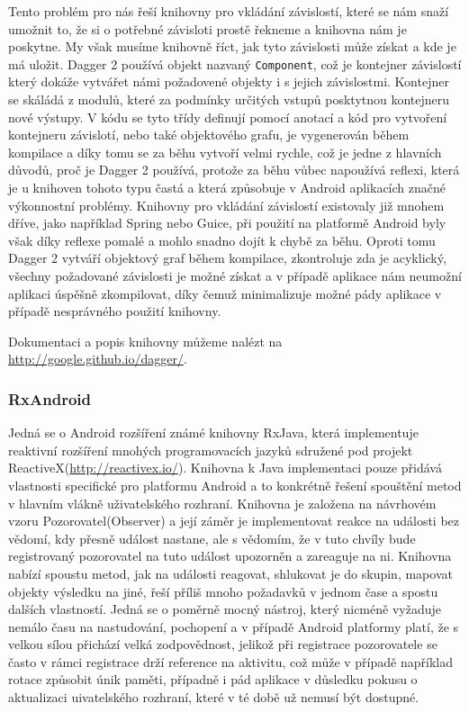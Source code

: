 \documentclass{article}
\begin{document}
Tento problém pro nás řeší knihovny pro vkládání závislostí, které se nám snaží umožnit to, že si o potřebné
závisloti prostě řekneme a knihovna nám je poskytne. My však musíme knihovně říct, jak tyto závislosti může
získat a kde je má uložit. Dagger 2 používá objekt nazvaný \texttt{Component}, což je kontejner závislostí
který dokáže vytvářet námi požadovené objekty i s jejich závislostmi. Kontejner se skáládá z modulů, které
za podmínky určitých vstupů posktytnou kontejneru nové výstupy. V kódu se tyto třídy definují pomocí anotací
a kód pro vytvoření kontejneru závislotí, nebo také objektového grafu, je vygenerován během kompilace
a díky tomu se za běhu vytvoří velmi rychle, což je jedne z hlavních důvodů, proč je Dagger 2 používá,
protože za běhu vůbec napoužívá reflexi, která je u knihoven tohoto typu častá a která způsobuje v Android
aplikacích značné výkonnostní problémy. Knihovny pro vkládání závislostí existovaly již mnohem dříve,
jako například Spring nebo Guice, při použití na platformě Android byly však díky reflexe pomalé a mohlo snadno
dojít k chybě za běhu. Oproti tomu Dagger 2 vytváří objektový graf během kompilace, zkontroluje zda je acyklický,
všechny požadované závislosti je možné získat a v případě aplikace nám neumožní aplikaci úspěšně zkompilovat,
díky čemuž minimalizuje možné pády aplikace v případě nesprávného použití knihovny.

Dokumentaci a popis knihovny můžeme nalézt na \url{http://google.github.io/dagger/}.

\subsubsection{RxAndroid}
Jedná se o Android rozšíření známé knihovny RxJava, která implementuje reaktivní rozšíření
mnohých programovacích jazyků sdružené pod projekt ReactiveX(\url{http://reactivex.io/}).
Knihovna k Java implementaci pouze přidává vlastnosti specifické pro platformu Android a to konkrétně
řešení spouštění metod v hlavním vlákně uživatelského rozhraní. Knihovna je založena na návrhovém
vzoru Pozorovatel(Observer) a její záměr je implementovat reakce na události bez vědomí, kdy přesně
událost nastane, ale s vědomím, že v tuto chvíly bude registrovaný pozorovatel na tuto událost
upozorněn a zareaguje na ni. Knihovna nabízí spoustu metod, jak na události reagovat, shlukovat je do
skupin, mapovat objekty výsledku na jiné, řeší příliš mnoho požadavků v jednom čase a spostu dalších vlastností.
Jedná se o poměrně mocný nástroj, který nicméně vyžaduje nemálo času na nastudování, pochopení a v případě
Android platformy platí, že s velkou sílou přichází velká zodpovědnost, jelikož při registrace pozorovatele
se často v rámci registrace drží reference na aktivitu, což může v případě například rotace způsobit únik paměti,
případně i pád aplikace v důsledku pokusu o aktualizaci uivatelského rozhraní, které v té době už nemusí být dostupné.
\end{document}
